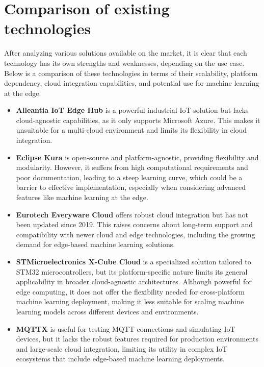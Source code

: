 \section{Comparison of existing technologies}
After analyzing various solutions available on the market, it is clear that each technology has its own strengths and weaknesses, depending on the use case. Below is a comparison of these technologies in terms of their scalability, platform dependency, cloud integration capabilities, and potential use for machine learning at the edge.

\begin{itemize}
    \item \textbf{Alleantia IoT Edge Hub} is a powerful industrial IoT solution but lacks cloud-agnostic capabilities, as it only supports Microsoft Azure. This makes it unsuitable for a multi-cloud environment and limits its flexibility in cloud integration.

    \item \textbf{Eclipse Kura} is open-source and platform-agnostic, providing flexibility and modularity. However, it suffers from high computational requirements and poor documentation, leading to a steep learning curve, which could be a barrier to effective implementation, especially when considering advanced features like machine learning at the edge.

    \item \textbf{Eurotech Everyware Cloud} offers robust cloud integration but has not been updated since 2019. This raises concerns about long-term support and compatibility with newer cloud and edge technologies, including the growing demand for edge-based machine learning solutions.

    \item \textbf{STMicroelectronics X-Cube Cloud} is a specialized solution tailored to STM32 microcontrollers, but its platform-specific nature limits its general applicability in broader cloud-agnostic architectures. Although powerful for edge computing, it does not offer the flexibility needed for cross-platform machine learning deployment, making it less suitable for scaling machine learning models across different devices and environments.

    \item \textbf{MQTTX} is useful for testing MQTT connections and simulating IoT devices, but it lacks the robust features required for production environments and large-scale cloud integration, limiting its utility in complex IoT ecosystems that include edge-based machine learning deployments.


\end{itemize}
